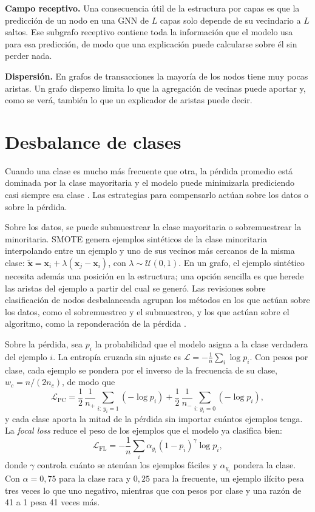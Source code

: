 \textbf{Campo receptivo.} Una consecuencia útil de la estructura por capas es que la predicción
de un nodo en una GNN de $L$ capas solo depende de su vecindario a $L$ saltos. Ese subgrafo
receptivo contiene toda la información que el modelo usa para esa predicción, de modo que una
explicación puede calcularse sobre él sin perder nada.

\textbf{Dispersión.} En grafos de transacciones la mayoría de los nodos tiene muy pocas aristas.
Un grafo disperso limita lo que la agregación de vecinas puede aportar y, como se verá, también
lo que un explicador de aristas puede decir.

\section{Desbalance de clases}\label{sec:desbalance}

Cuando una clase es mucho más frecuente que otra, la pérdida promedio está dominada por la
clase mayoritaria y el modelo puede minimizarla prediciendo casi siempre esa clase
\cite{He2009Imbalanced, Johnson2019Survey}. Las estrategias para compensarlo actúan sobre los
datos o sobre la pérdida.

Sobre los datos, se puede submuestrear la clase mayoritaria o sobremuestrear la minoritaria.
SMOTE \cite{Chawla2002SMOTE} genera ejemplos sintéticos de la clase minoritaria interpolando
entre un ejemplo y uno de sus vecinos más cercanos de la misma clase:
$\tilde{\mathbf{x}} = \mathbf{x}_i + \lambda(\mathbf{x}_j - \mathbf{x}_i)$, con
$\lambda \sim \mathcal{U}(0, 1)$. En un grafo, el ejemplo sintético necesita además una posición en la
estructura; una opción sencilla es que herede las aristas del ejemplo a partir del cual se
generó. Las revisiones sobre clasificación de nodos desbalanceada agrupan los métodos en los que
actúan sobre los datos, como el sobremuestreo y el submuestreo, y los que actúan sobre el
algoritmo, como la reponderación de la pérdida \cite{ERA2026Imbalanced}.

Sobre la pérdida, sea $p_i$ la probabilidad que el modelo asigna a la clase verdadera del
ejemplo $i$. La entropía cruzada sin ajuste es $\mathcal{L} = -\frac{1}{n}\sum_i \log p_i$.
Con pesos por clase, cada ejemplo se pondera por el inverso de la frecuencia de su clase,
$w_c = n / (2 n_c)$, de modo que
\begin{equation}
  \mathcal{L}_{\text{PC}} = \frac{1}{2}\,\frac{1}{n_{+}}\sum_{i:\,y_i = 1} (-\log p_i) +
  \frac{1}{2}\,\frac{1}{n_{-}}\sum_{i:\,y_i = 0} (-\log p_i),
\end{equation}
y cada clase aporta la mitad de la pérdida sin importar cuántos ejemplos tenga. La
\textit{focal loss} \cite{Lin2020Focal} reduce el peso de los ejemplos que el modelo ya
clasifica bien:
\begin{equation}
  \mathcal{L}_{\text{FL}} = -\frac{1}{n}\sum_i \alpha_{y_i} (1 - p_i)^{\gamma} \log p_i,
\end{equation}
donde $\gamma$ controla cuánto se atenúan los ejemplos fáciles y $\alpha_{y_i}$ pondera la
clase. Con $\alpha = 0{,}75$ para la clase rara y $0{,}25$ para la frecuente, un ejemplo
ilícito pesa tres veces lo que uno negativo, mientras que con pesos por clase y una razón de
41 a 1 pesa 41 veces más.

